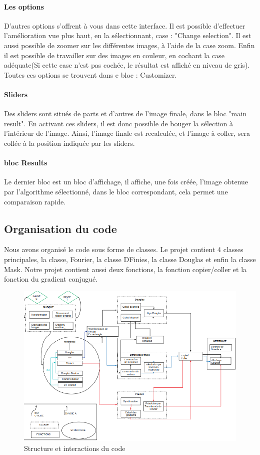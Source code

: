 \paragraph{Les options}
D'autres options s'offrent à vous dans cette interface. Il est possible d'effectuer l'amélioration vue plus haut, en la sélectionnant, case : "Change selection". Il est aussi possible de zoomer sur les différentes images, à l'aide de la case zoom. Enfin il est possible de travailler sur des images en couleur, en cochant la case adéquate(Si cette case n'est pas cochée, le résultat est affiché en niveau de gris). Toutes ces options se trouvent dans e bloc : Customizer.
\paragraph{Sliders}
Des sliders sont situés de parts et d'autres de l'image finale, dans le bloc "main result". En activant ces sliders, il est donc possible de bouger la sélection à l'intérieur de l'image. Ainsi, l'image finale est recalculée, et l'image à coller, sera collée à la position indiquée par les sliders.
\paragraph{bloc Results}
Le dernier bloc est un bloc d'affichage, il affiche, une fois créée, l'image obtenue par l'algorithme sélectionné, dans le bloc correspondant, cela permet une comparaison rapide.
\subsection{Organisation du code}
Nous avons organisé le code sous forme de classes. Le projet contient 4 classes principales, la classe, Fourier, la classe DFinies, la classe Douglas et enfin la classe  Mask. Notre projet contient aussi deux fonctions, la fonction copier/coller et la fonction du gradient conjugué.


\begin{figure}[!h]
\includegraphics[scale=0.65]{Images/code/schema.png}
\caption{Structure et interactions du code}
\end{figure}
\newpage

